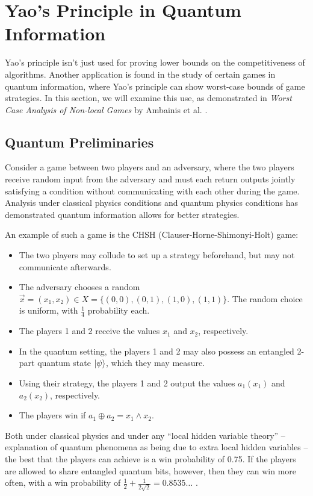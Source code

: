 \section{Yao's Principle in Quantum Information}

Yao's principle isn't just used for proving lower bounds on the competitiveness of algorithms. Another application is found in the study of certain games in quantum information, where Yao's principle can show worst-case bounds of game strategies. In this section, we will examine this use, as demonstrated in \emph{Worst Case Analysis of Non-local Games} by Ambainis et al. \cite{ABBSSV}.

\subsection{Quantum Preliminaries}

Consider a game between two players and an adversary, where the two players receive random input from the adversary and must each return outputs jointly satisfying a condition without communicating with each other during the game. Analysis under classical physics conditions and quantum physics conditions has demonstrated quantum information allows for better strategies.

An example of such a game is the CHSH (Clauser-Horne-Shimonyi-Holt) \cite{CHSH} game:

\begin{itemize}
\item{The two players may collude to set up a strategy beforehand, but may not communicate afterwards.}
\item{The adversary chooses a random $\vec{x}=(x_1, x_2) \in X=\{(0,0), (0,1), (1,0), (1,1)\}$. The random choice is uniform, with $\frac14$ probability each.}
\item{The players 1 and 2 receive the values $x_1$ and $x_2$, respectively.}
\item{In the quantum setting, the players 1 and 2 may also possess an entangled 2-part quantum state $\ket{\psi}$, which they may measure.}
\item{Using their strategy, the players 1 and 2 output the values $a_1(x_1)$ and $a_2(x_2)$, respectively.}
\item{The players win if $a_1 \oplus a_2 = x_1 \wedge x_2$.}
\end{itemize}

Both under classical physics and under any ``local hidden variable theory'' -- explanation of quantum phenomena as being due to extra local hidden variables -- the best that the players can achieve is a win probability of 0.75. If the players are allowed to share entangled quantum bits, however, then they can win more often, with a win probability of $\frac12 + \frac1{2\sqrt2} = 0.8535\ldots$ \cite{ABBSSV,CHSH}.

